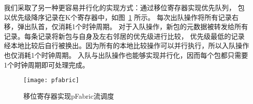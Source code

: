 我们采取了另一种更容易并行化的实现方式：通过移位寄存器实现优先队列\cite{895938}，
包以优先级降序记录在K个寄存器中，如图~\ref{fig:pfabric} 所示。
每次出队操作将所有记录右移，弹出队首，仅消耗1个时钟周期。
对于入队操作，新包的元数据被转发给所有记录。每条记录将新包与自身及左右邻居的优先级进行比较，
优先级最低的记录经本地比较后自行被换出。因为所有的本地比较操作可以并行执行，所以入队操作也仅消耗1个时钟周期。
入队与出队操作也能够实现并行化，因而每个包都只需要1个时钟周期即可处理完成。
\begin{figure}[htbp]
\centering
\texttt{[image: pfabric]}
\caption{移位寄存器实现pFabric流调度} \label{fig:pfabric}
\end{figure}

